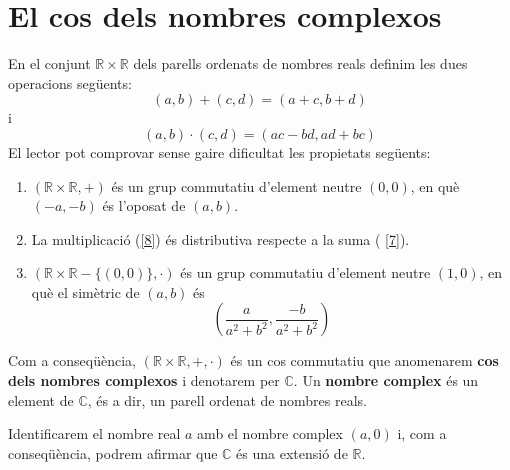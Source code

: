 \section{El cos dels nombres complexos}

En el conjunt $\mathbb{R}\times \mathbb{R}$ dels parells ordenats de nombres reals definim les dues operacions següents:
\begin{equation}
(a,b)+(c,d)=(a+c,b+d)  \label{7}
\end{equation}
i
\begin{equation}
(a,b)\cdot (c,d)=(ac-bd,ad+bc)  \label{8}
\end{equation}
El lector pot comprovar sense gaire dificultat les propietats següents:

\begin{enumerate}
\item $(\mathbb{R}\times \mathbb{R},+)$ és un grup commutatiu d’element neutre $(0,0)$, en què $(-a,-b)$ és l’oposat de $(a,b)$.

\item La multiplicació (\ref{8}) és distributiva respecte a la suma (
\ref{7}).

\item $(\mathbb{R}\times \mathbb{R}-\{(0,0)\},\cdot )$ és un grup
commutatiu d’element neutre $(1,0)$, en què el simètric de $(a,b)$
és
\begin{equation*}
\left( \frac{a}{a^{2}+b^{2}},\frac{-b}{a^{2}+b^{2}}\right)
\end{equation*}
\end{enumerate}

Com a conseqüència, $(\mathbb{R}\times \mathbb{R},+,\cdot )$ és un cos
commutatiu que anomenarem \textbf{cos dels nombres complexos}
i denotarem per $\mathbb{C}$. Un \textbf{nombre complex} és un
element de $\mathbb{C}$, és a dir, un parell ordenat de nombres reals.

Identificarem el nombre real $a$ amb el nombre complex $(a,0)$ i,
com a conseqüència, podrem afirmar que $\mathbb{C}$ és una extensió de
$\mathbb{R}$.

